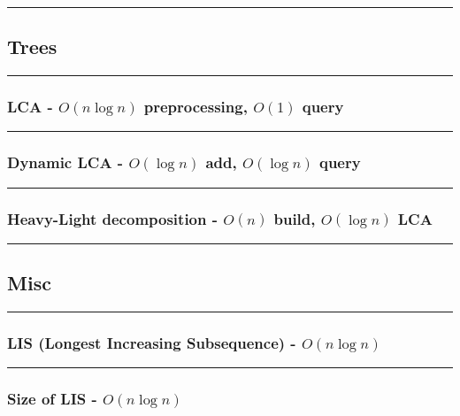 \documentclass[landscape,a4paper,twocolumn,10pt]{report}
\renewcommand{\line}{\noindent\rule{\linewidth}{1pt}}
\newcommand{\algosection}[1]{\line \subsection*{#1}}
\newcommand{\algorithm}[1]{\line \subsubsection*{#1}}
\begin{document}
\algosection{Trees}
\label{trees}

\algorithm{LCA - $O(n \log n)$ preprocessing, $O(1)$ query}


\algorithm{Dynamic LCA - $O(\log n)$ add, $O(\log n)$ query}


\algorithm{Heavy-Light decomposition - $O(n)$ build, $O(\log n)$ LCA}



\algosection{Misc}
\label{misc}

\algorithm{LIS (Longest Increasing Subsequence) - $O(n \log n)$}


\algorithm{Size of LIS - $O(n \log n)$}

\end{document}

